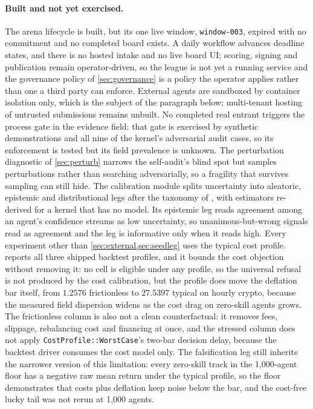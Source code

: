 \paragraph{Built and not yet exercised.} The arena lifecycle is built, but its one live window, \texttt{window-003}, expired with no commitment and no completed board exists. A daily workflow advances deadline states, and there is no hosted intake and no live board UI; scoring, signing and publication remain operator-driven, so the league is not yet a running service and the governance policy of \cref{sec:governance} is a policy the operator applies rather than one a third party can enforce. External agents are sandboxed by container isolation only, which is the subject of the paragraph below; multi-tenant hosting of untrusted submissions remains unbuilt. No completed real entrant triggers the process gate in the evidence field: that gate is exercised by synthetic demonstrations and all nine of the kernel's adversarial audit cases, so its enforcement is tested but its field prevalence is unknown. The perturbation diagnostic of \cref{sec:perturb} narrows the self-audit's blind spot but samples perturbations rather than searching adversarially, so a fragility that survives sampling can still hide. The calibration module splits uncertainty into aleatoric, epistemic and distributional legs after the taxonomy of \citet[p.~2]{lin2025trading}, with estimators re-derived for a kernel that has no model. Its epistemic leg reads agreement among an agent's confidence streams as low uncertainty, so unanimous-but-wrong signals read as agreement and the leg is informative only when it reads high. Every experiment other than \cref{sec:external,sec:seedleg} uses the typical cost profile.  reports all three shipped backtest profiles, and it bounds the cost objection without removing it: no cell is eligible under any profile, so the universal refusal is not produced by the cost calibration, but the profile does move the deflation bar itself, from $1.2576$ frictionless to $27.5397$ typical on hourly crypto, because the measured field dispersion widens as the cost drag on zero-skill agents grows. The frictionless column is also not a clean counterfactual: it removes fees, slippage, rebalancing cost and financing at once, and the stressed column does not apply \texttt{CostProfile::WorstCase}'s two-bar decision delay, because the backtest driver consumes the cost model only. The falsification leg still inherits the narrower version of this limitation: every zero-skill track in the 1{,}000-agent floor has a negative raw mean return under the typical profile, so the floor demonstrates that costs plus deflation keep noise below the bar, and the cost-free lucky tail was not rerun at 1{,}000 agents.

